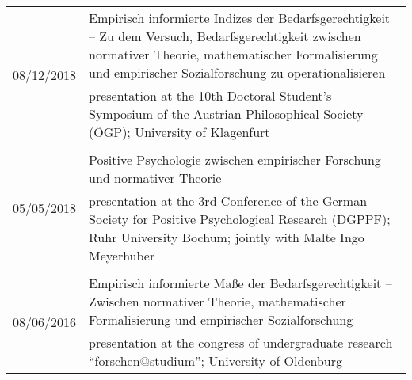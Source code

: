 \documentclass[a4paper,10pt]{article}
\begin{document}
\begin{longtable}{p{2.25cm}p{11cm}}
\\
\multirow{2}{2.25cm}{\footnotesize{08/12/2018}} & Empirisch informierte Indizes der Bedarfsgerechtigkeit -- Zu dem Versuch, Bedarfsgerechtigkeit zwischen normativer Theorie, mathematischer Formalisierung und empirischer Sozialforschung zu operationalisieren\\
& \footnotesize{presentation at the 10th Doctoral Student's Symposium of the Austrian Philosophical Society (ÖGP); University of Klagenfurt}\\
\\
\multirow{2}{2.25cm}{\footnotesize{05/05/2018}} & Positive Psychologie zwischen empirischer Forschung und normativer Theorie\\
& \footnotesize{presentation at the 3rd Conference of the German Society for Positive Psychological Research (DGPPF); Ruhr University Bochum; jointly with Malte Ingo Meyerhuber}\\
\\
\multirow{2}{2.25cm}{\footnotesize{08/06/2016}} & Empirisch informierte Maße der Bedarfsgerechtigkeit -- Zwischen normativer Theorie, mathematischer Formalisierung und empirischer Sozialforschung\\
& \footnotesize{presentation at the congress of undergraduate research \enquote{forschen@studium}; University of Oldenburg}\\
\end{longtable}
\end{document}
